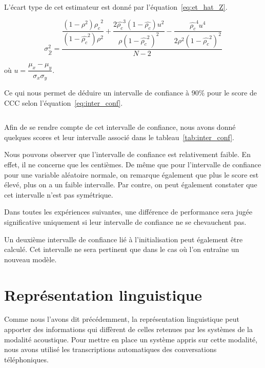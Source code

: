 L'écart type de cet estimateur est donné par l'équation~\ref{eq:et_hat_Z}.

\begin{equation}
\sigma_{\hat{Z} }^2 = \dfrac{\dfrac{(1-\rho^2) \hat{\rho_c} ^2}{(1-\hat{\rho_c}^2)\rho^2 } +  \dfrac{2\hat{\rho_c} ^3(1-\hat{\rho_c} )u^2}{\rho(1-\hat{\rho_c} ^2)^2} - \dfrac{\hat{\rho_c}^4 u^4}{2 \rho^2 (1-\hat{\rho_c}^2 )^2}}{N-2}
\label{eq:et_hat_Z}
\end{equation}

où $u = \dfrac{\mu_x - \mu_y}{\sigma_x \sigma_y}$.

Ce qui nous permet de déduire un intervalle de confiance à $90\%$ pour le score de CCC selon l'équation~\ref{eq:inter_conf}.

\begin{equation}
    [\tanh (\hat{Z} - 1.64 \sigma_{\hat{Z}}); \tanh(\hat{Z} + 1.64 \sigma_{\hat{Z}})]
    \label{eq:inter_conf}
\end{equation}

Afin de se rendre compte de cet intervalle de confiance, nous avons donné quelques scores et leur intervalle associé dans le tableau~\ref{tab:inter_conf}.



Nous pouvons observer que l'intervalle de confiance est relativement faible. En effet, il ne concerne que les centièmes. De même que pour l'intervalle de confiance pour une variable aléatoire normale, on remarque également que plus le score est élevé, plus on a un faible intervalle. Par contre, on peut également constater que cet intervalle n'est pas symétrique.

Dans toutes les expériences suivantes, une différence de performance sera jugée significative uniquement si leur intervalle de confiance ne se chevauchent pas.

Un deuxième intervalle de confiance lié à l'initialisation peut également être calculé. Cet intervalle ne sera pertinent que dans le cas où l'on entraîne un nouveau modèle.

\section{Représentation linguistique}
Comme nous l'avons dit précédemment, la représentation linguistique peut apporter des informations qui diffèrent de celles retenues par les systèmes de la modalité acoustique. Pour mettre en place un système appris sur cette modalité, nous avons utilisé les transcriptions automatiques des conversations téléphoniques.


